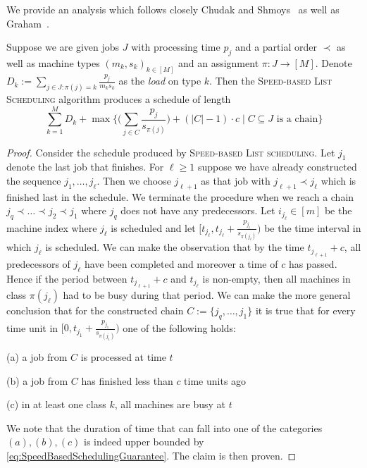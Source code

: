   
  
  We provide an analysis which follows closely Chudak and Shmoys~\cite{UniformlyRelatedMachinesWithPrecedences-ChudakShmoys-JALG99} as well as Graham~\cite{GrahamListScheduling1966}.
  \begin{lemma}
  Suppose we are given jobs $J$ with processing time $p_j$ and a partial order $\prec$ as well as machine types $(m_k,s_k)_{k \in [M]}$ and  an assignment $\pi : J \to [M]$. Denote $D_k := \sum_{j \in J: \pi(j) = k} \frac{p_j}{m_ks_k}$ as the \emph{load} on type $k$. Then the \textsc{Speed-based List Scheduling} algorithm produces a schedule of length
  \begin{equation} \label{eq:SpeedBasedSchedulingGuarantee}
    \sum_{k=1}^M D_k +  \max\Big\{ \Big(\sum_{j \in C} \frac{p_j}{s_{\pi(j)}}\Big) + (|C|-1) \cdot c \mid C \subseteq J\textrm{ is a chain} \Big\}
  \end{equation}
  \end{lemma}
  \begin{proof}
    Consider the schedule produced by {\textsc{Speed-based List scheduling}}. Let $j_1$ denote the last job that
    finishes. For $\ell \geq 1$ suppose we have already constructed the sequence  $j_1,\ldots,j_{\ell}$. Then we choose  $j_{\ell+1}$ as that job with $j_{\ell+1} \prec j_{\ell}$
    which is finished last in the schedule. We terminate the procedure when we reach a chain $j_q \prec \ldots \prec j_2 \prec j_1$  where $j_q$ does not have any predecessors. Let $i_{j_{\ell}} \in [m]$ be the machine index where $j_{\ell}$ is scheduled and let $[t_{j_{\ell}},t_{j_{\ell}}+\frac{p_{j_{\ell}}}{s_{\pi(j_{\ell})}})$ be the time interval in which $j_{\ell}$ is scheduled. We can make the observation that by the time $t_{j_{\ell+1}} + c$, all predecessors of $j_{\ell}$ have been completed and moreover a time of $c$ has passed.
    Hence if the period between $t_{j_{\ell+1}}+c$ and $t_{j_{\ell}}$ is non-empty, then all machines in class $\pi(j_{\ell})$ had to be busy during that period.
    We can make the more general conclusion that for the constructed chain $C := \{ j_{q},\ldots,j_1\}$ it is true that for every time unit in $[0,t_{j_1}+\frac{p_{j_1}}{s_{\pi(j_1)}})$ one of the following holds:
    \begin{itemize*}
    \item[(a)] a job from $C$ is processed at time $t$
    \item[(b)] a job from $C$ has finished less than $c$ time units ago
    \item[(c)] in at least one class $k$, all machines are busy at $t$
    \end{itemize*}
    We note that the duration of time that can fall into one of the categories $(a),(b),(c)$ is indeed upper bounded by  \eqref{eq:SpeedBasedSchedulingGuarantee}. The claim is then proven.
  \end{proof}
  
